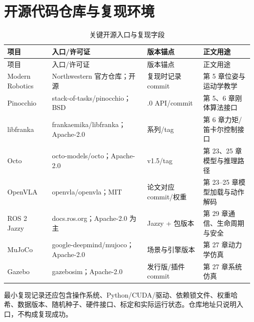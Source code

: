 \chapter{开源代码仓库与复现环境}
\label{app:code-reproduction}

\begin{longtable}{>{\raggedright\arraybackslash}p{}>{\raggedright\arraybackslash}p{}>{\raggedright\arraybackslash}p{}>{\raggedright\arraybackslash}p{}}
\caption{关键开源入口与复现字段}\label{tab:code-reproduction-index}\\
\toprule
项目 & 入口/许可证 & 版本锚点 & 正文用途 \\
\midrule\endfirsthead
\toprule 项目 & 入口/许可证 & 版本锚点 & 正文用途 \\
\midrule\endhead
Modern Robotics & Northwestern 官方仓库；开源 & 复现时记录 commit & 第 5 章位姿与运动学教学 \\
Pinocchio & stack-of-tasks/\allowbreak pinocchio；BSD & 3.4.0 API/commit & 第 5、6 章刚体算法接口 \\
libfranka & frankaemika/\allowbreak libfranka；Apache-2.0 & 0.15 系列/tag & 第 6 章力矩/笛卡尔控制接口 \\
Octo & octo-models/\allowbreak octo；Apache-2.0 & v1.5/tag & 第 23、25 章模型与推理路径 \\
OpenVLA & openvla/\allowbreak openvla；MIT & 论文对应 commit/权重 & 第 23--25 章模型加载与动作解码 \\
ROS 2 Jazzy & docs.ros.org；Apache-2.0 为主 & Jazzy + 包版本 & 第 29 章通信、生命周期与安全 \\
MuJoCo & google-deepmind/\allowbreak mujoco；Apache-2.0 & 场景与引擎版本 & 第 27 章动力学仿真 \\
Gazebo & gazebosim；Apache-2.0 & 发行版/插件 commit & 第 27 章系统仿真 \\
\bottomrule
\end{longtable}

最小复现记录还应包含操作系统、Python/CUDA/驱动、依赖锁文件、权重哈希、数据版本、随机种子、硬件接口、标定和实际运行状态。仓库地址只说明入口，不构成复现成功。
